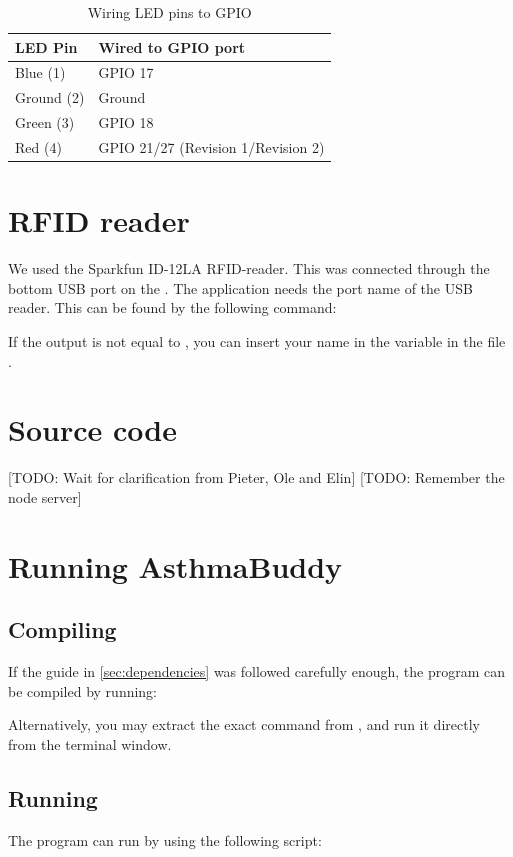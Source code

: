\begin{table}[H]
\centering
\begin{tabular}{|p{3.0cm}| p{3.0cm}|}
	\hline
	\textbf{LED Pin} & \textbf{Wired to GPIO port}\\
	\hline
	Blue (1) & GPIO 17\\
	\hline
	Ground (2) & Ground\\
	\hline
	Green (3) & GPIO 18\\
	\hline
	Red (4) & GPIO 21/27 (Revision 1/Revision 2)\\
	\hline
\end{tabular}
\caption{Wiring LED pins to GPIO}
\label{tab:wiringgpio}
\end{table}

\section{RFID reader}
We used the Sparkfun ID-12LA RFID-reader. This was connected through the bottom USB port on the \rpi{}. 
The application needs the port name of the USB reader. This can be found by the following command: 


If the output is not equal to , you can insert your name in the variable  in the file . 
 
\section{Source code}
\label{sec:sourcecode}
[TODO: Wait for clarification from Pieter, Ole and Elin]
[TODO: Remember the node server]


\section{Running AsthmaBuddy}

\subsection{Compiling}
If the guide in \ref{sec:dependencies} was followed carefully enough, the program can be compiled by running:


Alternatively, you may extract the exact command from , and run it directly from the terminal window. 

\subsection{Running}
The program can run by using the following script:

